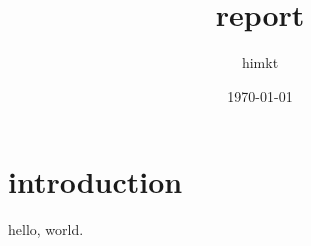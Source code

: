 \documentclass[dvipdfmx, twocolumn]{jsarticle}
\title{report}
\author{himkt}
\date{\today}
\begin{document}
\maketitle
\section{introduction}
hello, world\cite{greenwade93}.



\end{document}
